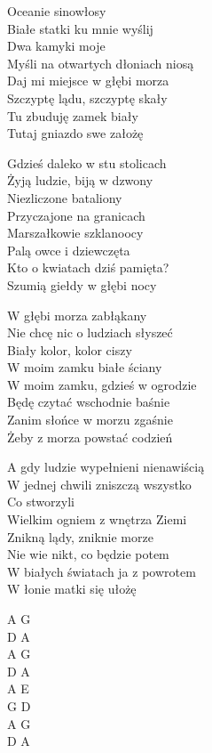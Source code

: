 \begin{text}
    Oceanie sinowłosy\\
    Białe statki ku mnie wyślij\\
    Dwa kamyki moje\\
    Myśli na otwartych dłoniach niosą\\
    Daj mi miejsce w głębi morza\\
    Szczyptę lądu, szczyptę skały\\
    Tu zbuduję zamek biały\\
    Tutaj gniazdo swe założę

    Gdzieś daleko w stu stolicach\\
    Żyją ludzie, biją w dzwony\\
    Niezliczone bataliony\\
    Przyczajone na granicach\\
    Marszałkowie szklanoocy\\
    Palą owce i dziewczęta\\
    Kto o kwiatach dziś pamięta?\\
    Szumią giełdy w głębi nocy

    W głębi morza zabłąkany\\
    Nie chcę nic o ludziach słyszeć\\
    Biały kolor, kolor ciszy\\
    W moim zamku białe ściany\\
    W moim zamku, gdzieś w ogrodzie\\
    Będę czytać wschodnie baśnie\\
    Zanim słońce w morzu zgaśnie\\
    Żeby z morza powstać codzień

    A gdy ludzie wypełnieni nienawiścią\\
    W jednej chwili zniszczą wszystko\\
    Co stworzyli\\
    Wielkim ogniem z wnętrza Ziemi\\
    Znikną lądy, zniknie morze\\
    Nie wie nikt, co będzie potem\\
    W białych światach ja z powrotem\\
    W łonie matki się ułożę
\end{text}
\begin{chord}
    A G\\
    D A\\
    A G\\
    D A\\
    A E\\
    G D\\
    A G\\
    D A
\end{chord}